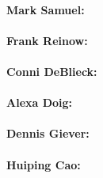 \paragraph{Mark Samuel:}
\paragraph{Frank Reinow:}
\paragraph{Conni DeBlieck:}
\paragraph{Alexa Doig:}
\paragraph{Dennis Giever:}
\paragraph{Huiping Cao:}
